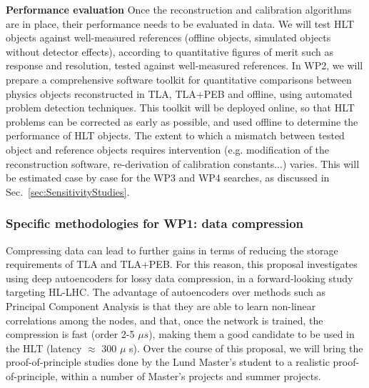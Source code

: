 \textbf{Performance evaluation} Once the reconstruction and calibration algorithms are in place, their performance needs to be evaluated in data.
We will test HLT objects against well-measured references (offline objects, simulated objects without detector effects), according to quantitative figures of merit such as response and resolution, tested against well-measured references. 
In WP2, we will prepare a comprehensive software toolkit for quantitative comparisons between physics objects reconstructed in TLA, TLA+PEB and offline, using automated problem detection techniques. 
This toolkit will be deployed online, so that HLT problems can be corrected as early as possible, and used offline to determine the performance of HLT objects.  
The extent to which a mismatch between tested object and reference objects requires intervention (e.g. modification of the reconstruction software, re-derivation of calibration constants...) varies. This will be estimated case by case for the WP3 and WP4 searches, as discussed in Sec.~\ref{sec:SensitivityStudies}.
 
\subsubsection{Specific methodologies for WP1: data compression}

Compressing data can lead to further gains in terms of reducing the storage requirements of TLA and TLA+PEB. 
For this reason, this proposal investigates using deep autoencoders for lossy data compression, in a forward-looking study targeting HL-LHC. 
The advantage of autoencoders over methods such as Principal Component Analysis is that they are able to learn non-linear correlations among the nodes, 
and that, once the network is trained, the compression is fast (order 2-5 $\mu s$), making them a good candidate to be used in the HLT (latency $\approx$ 300 $\mu$ s). 
Over the course of this proposal, we will bring the proof-of-principle studies done by the Lund Master's student to a realistic proof-of-principle, within a number of Master's projects and summer projects. 

